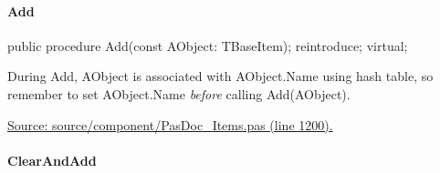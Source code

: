\documentclass{report}
\newif\ifpdf
\begin{document}
\paragraph*{Add}\hspace*{\fill}

\label{PasDoc_Items.TBaseItems-Add}
\begin{list}{}{
\setlength{\itemindent}{0cm}
\setlength{\listparindent}{0cm}
\setlength{\leftmargin}{\evensidemargin}
\addtolength{\leftmargin}{\tmplength}
\settowidth{\labelsep}{X}
\addtolength{\leftmargin}{\labelsep}
\setlength{\labelwidth}{\tmplength}
}
\item[\textbf{Declaration}\hfill]
\ifpdf
\begin{flushleft}
\fi
\begin{ttfamily}
public procedure Add(const AObject: TBaseItem); reintroduce; virtual;\end{ttfamily}

\ifpdf
\end{flushleft}
\fi

\par
\item[\textbf{Description}]
During Add, AObject is associated with AObject.Name using hash table, so remember to set AObject.Name \textit{before} calling Add(AObject).\par
\href{https://github.com/pasdoc/pasdoc/blob/master/source/component/PasDoc_Items.pas#L1200}{Source: source/component/PasDoc{\_}Items.pas (line 1200).}

\end{list}
\paragraph*{ClearAndAdd}\hspace*{\fill}
\end{document}

